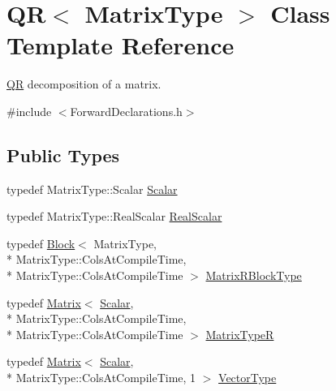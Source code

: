\hypertarget{class_q_r}{\section{Q\-R$<$ Matrix\-Type $>$ Class Template Reference}
\label{class_q_r}
}


\hyperlink{class_q_r}{Q\-R} decomposition of a matrix.  




{\ttfamily \#include $<$Forward\-Declarations.\-h$>$}

\subsection*{Public Types}
\begin{DoxyCompactItemize}
\item 
typedef Matrix\-Type\-::\-Scalar \hyperlink{class_q_r_a5f4284ebeb0fde1aea76f13a0732efb1}{Scalar}
\item 
typedef Matrix\-Type\-::\-Real\-Scalar \hyperlink{class_q_r_a88b7ec70e1ec3baf52eca8fc2163d517}{Real\-Scalar}
\item 
typedef \hyperlink{class_block}{Block}$<$ Matrix\-Type, \\*
Matrix\-Type\-::\-Cols\-At\-Compile\-Time, \\*
Matrix\-Type\-::\-Cols\-At\-Compile\-Time $>$ \hyperlink{class_q_r_a91f032a54dbe9fd7ba2351326b6d1f13}{Matrix\-R\-Block\-Type}
\item 
typedef \hyperlink{class_matrix}{Matrix}$<$ \hyperlink{class_q_r_a5f4284ebeb0fde1aea76f13a0732efb1}{Scalar}, \\*
Matrix\-Type\-::\-Cols\-At\-Compile\-Time, \\*
Matrix\-Type\-::\-Cols\-At\-Compile\-Time $>$ \hyperlink{class_q_r_aaeacfc768cb9f327bdf69962473059d0}{Matrix\-Type\-R}
\item 
typedef \hyperlink{class_matrix}{Matrix}$<$ \hyperlink{class_q_r_a5f4284ebeb0fde1aea76f13a0732efb1}{Scalar}, \\*
Matrix\-Type\-::\-Cols\-At\-Compile\-Time, 1 $>$ \hyperlink{class_q_r_aa143adafe838b6aa495e342c52a21f0e}{Vector\-Type}
\end{DoxyCompactItemize}
